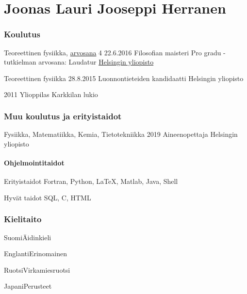\documentclass{tccv}
\begin{document}
\part{Joonas Lauri Jooseppi Herranen}

\section{Koulutus}
\begin{yearlist}
	\item[Teoreettinen fysiikka, \href{https://wiki.helsinki.fi/display/mathstatOpiskelu/Kokonaisuuksien+arvostelu}{arvosana} 4]{22.6.2016}
	{Filosofian maisteri}
	{Pro gradu -tutkielman arvosana: Laudatur
	\href{mailto:registrar@helsinki.fi}{Helsingin yliopisto}}
	
	\item[Teoreettinen fysiikka]{28.8.2015}
	{Luonnontieteiden kandidaatti}
	{Helsingin yliopisto}
	\item[] {2011}
	{Ylioppilas}
	{Karkkilan lukio}
\end{yearlist}

\section{Muu koulutus ja erityistaidot}
\begin{yearlist}
	\item[Fysiikka, Matematiikka, Kemia,  \hspace{20mm} \linebreak Tietotekniikka]{2019}
	{Aineenopettaja}
	{Helsingin yliopisto}
\end{yearlist}

\subsection{Ohjelmointitaidot}
\begin{factlist}
	\item{Erityistaidot}
	{Fortran, Python, \LaTeX, Matlab, Java, Shell}
	
	\item{Hyvät taidot}
	{SQL, C, HTML}
\end{factlist}

\section{Kielitaito}
\begin{factlist}
	\item{Suomi}{Äidinkieli}
	\item{Englanti}{Erinomainen}
	\item{Ruotsi}{Virkamiesruotsi}
	\item{Japani}{Perusteet}
\end{factlist}
\end{document}
